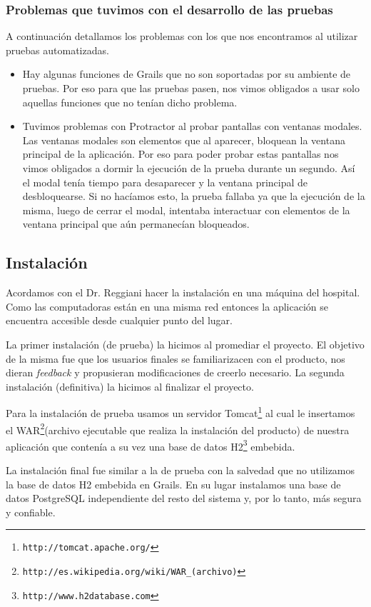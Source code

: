 \subsubsection{Problemas que tuvimos con el desarrollo de las pruebas}
A continuación detallamos los problemas con los que nos encontramos al utilizar pruebas automatizadas.
\begin{itemize}
\item Hay algunas funciones de Grails que no son soportadas por su ambiente de pruebas. Por eso para que las pruebas pasen, nos vimos obligados a usar solo aquellas funciones que no tenían dicho problema.
\item Tuvimos problemas con Protractor al probar pantallas con ventanas modales. Las ventanas modales son elementos que al aparecer, bloquean la ventana principal de la aplicación. Por eso para poder probar estas pantallas nos vimos obligados a dormir la ejecución de la prueba durante un segundo. Así el modal tenía tiempo para desaparecer y la ventana principal de desbloquearse. Si no hacíamos esto, la prueba fallaba ya que la ejecución de la misma, luego de cerrar el modal, intentaba interactuar con elementos de la ventana principal que aún permanecían bloqueados.
\end{itemize}

\subsection{Instalación}
Acordamos con el Dr. Reggiani hacer la instalación en una máquina del hospital. Como las computadoras están en una misma red entonces la aplicación se encuentra accesible desde cualquier punto del lugar.

La primer instalación (de prueba) la hicimos al promediar el proyecto. El objetivo de la misma fue que los usuarios finales se familiarizacen con el producto, nos dieran \textit{feedback} y propusieran modificaciones de creerlo necesario. La segunda instalación (definitiva) la hicimos al finalizar el proyecto.

Para la instalación de prueba usamos un servidor Tomcat\footnote{\texttt{http://tomcat.apache.org/}} al cual le insertamos el WAR\footnote{\texttt{http://es.wikipedia.org/wiki/WAR\_(archivo)}}(archivo ejecutable que realiza la instalación del producto) de nuestra aplicación que contenía a su vez una base de datos H2\footnote{\texttt{http://www.h2database.com}} embebida.

La instalación final fue similar a la de prueba con la salvedad que no utilizamos la base de datos H2 embebida en Grails. En su lugar instalamos una base de datos PostgreSQL independiente del resto del sistema y, por lo tanto, más segura y confiable.


